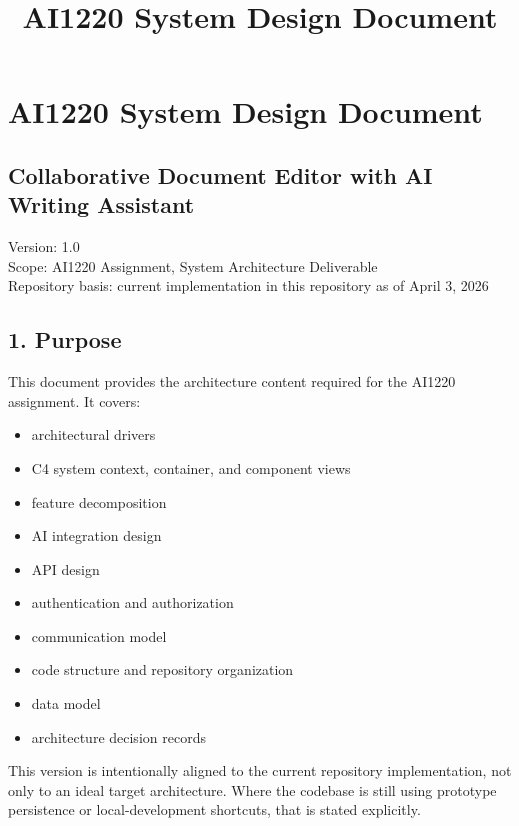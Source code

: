 \documentclass[a4paper]{article}
\title{AI1220 System Design Document}
\author{}
\date{}
\providecommand{\tightlist}{%
  \setlength{\itemsep}{0pt}\setlength{\parskip}{0pt}}
\begin{document}
\maketitle

\section{AI1220 System Design
Document}\label{ai1220-system-design-document}

\subsection{Collaborative Document Editor with AI Writing
Assistant}\label{collaborative-document-editor-with-ai-writing-assistant}

Version: 1.0\\
Scope: AI1220 Assignment, System Architecture Deliverable\\
Repository basis: current implementation in this repository as of April
3, 2026

\subsection{1. Purpose}\label{1-purpose}

This document provides the architecture content required for the AI1220
assignment. It covers:

\begin{itemize}
\tightlist
\item
  architectural drivers
\item
  C4 system context, container, and component views
\item
  feature decomposition
\item
  AI integration design
\item
  API design
\item
  authentication and authorization
\item
  communication model
\item
  code structure and repository organization
\item
  data model
\item
  architecture decision records
\end{itemize}

This version is intentionally aligned to the current repository
implementation, not only to an ideal target architecture. Where the
codebase is still using prototype persistence or local-development
shortcuts, that is stated explicitly.
\end{document}
